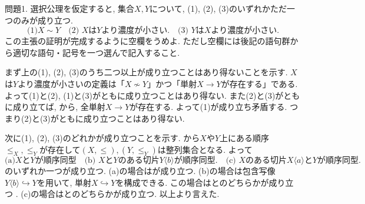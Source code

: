 \documentclass[dvipdfmx,a4paper,11pt]{article}
\theoremstyle{definition}
\begin{document}
 
問題1.  選択公理を仮定すると, 集合$X, Y$について, (1), (2), (3)のいずれかただ一つのみが成り立つ.
$$
\text{(1)$X \sim Y$}
\quad
\text{(2) $X$は$Y$より濃度が小さい.}
\quad
\text{(3) $Y$は$X$より濃度が小さい.}
$$
 この主張の証明が完成するように空欄をうめよ. ただし空欄には後記の語句群から適切な語句・記号を一つ選んで記入すること.

\medskip
 [証明.]まず上の(1), (2), (3)のうち二つ以上が成り立つことはあり得ないことを示す. 
$X$は$Y$より濃度が小さいの定義は「$X \not \sim Y$」かつ「単射$X \to Y$が存在する」である.
よって(1)と(2), (1)と(3)がともに成り立つことはあり得ない.
また(2)と(3)がともに成り立てば, \boxed{\phantom{hogehoge}}から, 全単射$X \to Y$が存在する.
よって(1)が成り立ち矛盾する. つまり(2)と(3)がともに成り立つことはあり得ない.

次に(1), (2), (3)のどれかが成り立つことを示す.
\boxed{\phantom{hogehoge}}から$X$や$Y$上にある順序$\le_X, \le_Y$が存在して$(X, \le), (Y, \le_Y)$は整列集合となる. 
よって
$$
\text{(a)$X$と$Y$が順序同型}
\quad
\text{(b) $X$と$Y$のある切片$Y\langle b\rangle$が順序同型.}
\quad
\text{(c) $X$のある切片$X\langle a\rangle$と$Y$が順序同型.}
$$
  のいずれか一つが成り立つ. 
  (a)の場合は\boxed{\phantom{hogehoge}}が成り立つ.
 (b)の場合は包含写像$Y\langle b\rangle \hookrightarrow Y$を用いて, 単射$X \hookrightarrow Y$を構成できる. 
 この場合は\boxed{\phantom{hogehoge}}と\boxed{\phantom{hogehoge}}のどちらかが成り立つ . 
 (c)の場合は\boxed{\phantom{hogehoge}}と\boxed{\phantom{hogehoge}}のどちらかが成り立つ. 以上より言えた. 
  
\end{document}
